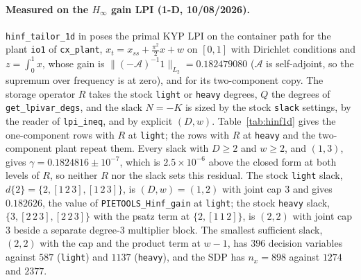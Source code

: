 \documentclass[12pt]{article}
\newcommand{\mcl}[1]{\mathcal{#1}}
\newcommand{\code}[1]{\texttt{#1}}
\newcommand{\file}[1]{\path{#1}}      %
\theoremstyle{plain}
\theoremstyle{definition}
\theoremstyle{remark}
\begin{document}
\paragraph{Measured on the $H_\infty$ gain LPI (1-D, 10/08/2026).} \code{hinf\_tailor\_1d} in \file{lpi\_programming/examples} poses the primal KYP LPI on the container path for the plant \code{io1} of \code{cx\_plant}, $x_t=x_{ss}+\tfrac{\pi^2}{2}x+w$ on $[0,1]$ with Dirichlet conditions and $z=\int_0^1x$, whose gain is $\|(-\mcl A)^{-1}1\|_{L_2}=0.182479080$ ($\mcl A$ is self-adjoint, so the supremum over frequency is at zero), and for its two-component copy. The storage operator $R$ takes the stock \code{light} or \code{heavy} degrees, $Q$ the degrees of \code{get\_lpivar\_degs}, and the slack $N=-K$ is sized by the stock \code{slack} settings, by the reader of \code{lpi\_ineq}, and by explicit $(D,w)$. Table~\ref{tab:hinf1d} gives the one-component rows with $R$ at \code{light}; the rows with $R$ at \code{heavy} and the two-component plant repeat them. Every slack with $D\ge2$ and $w\ge2$, and $(1,3)$, gives $\gamma=0.1824816\pm10^{-7}$, which is $2.5\times10^{-6}$ above the closed form at both levels of $R$, so neither $R$ nor the slack sets this residual. The stock \code{light} slack, $d\{2\}=\{2,[1\,2\,3],[1\,2\,3]\}$, is $(D,w)=(1,2)$ with joint cap $3$ and gives $0.182626$, the value of \code{PIETOOLS\_Hinf\_gain} at \code{light}; the stock \code{heavy} slack, $\{3,[2\,2\,3],[2\,2\,3]\}$ with the psatz term at $\{2,[1\,1\,2]\}$, is $(2,2)$ with joint cap $3$ beside a separate degree-3 multiplier block. The smallest sufficient slack, $(2,2)$ with the cap and the product term at $w-1$, has $396$ decision variables against $587$ (\code{light}) and $1137$ (\code{heavy}), and the SDP has $n_x=898$ against $1274$ and $2377$.
\end{document}
